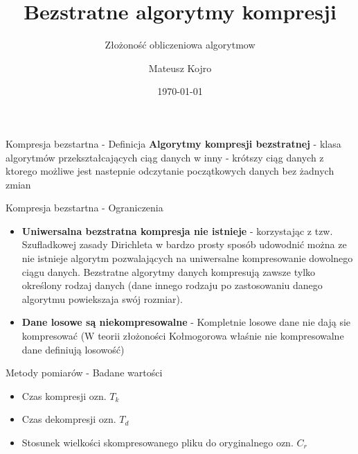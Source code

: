 \documentclass[aspectratio=169]{beamer}
\title{Bezstratne algorytmy kompresji}
\subtitle{Złożoność obliczeniowa algorytmow}
\author{Mateusz Kojro}
\date{\today}
\begin{document}
    \begin{frame}[plain]
        \maketitle
    \end{frame}

    \begin{frame}{Kompresja bezstartna - Definicja}
        \textbf{Algorytmy kompresji bezstratnej} - klasa algorytmów przekształcających ciąg
        danych w inny - krótszy ciąg danych z ktorego możliwe jest nastepnie
        odczytanie początkowych danych bez żadnych zmian
    \end{frame}

    
    \begin{frame}{Kompresja bezstartna - Ograniczenia}
        \begin{itemize}
            \item \textbf{Uniwersalna bezstratna kompresja nie istnieje} - korzystając z tzw. Szufladkowej zasady Dirichleta w bardzo prosty sposób udowodnić można ze nie istnieje algorytm pozwalających na uniwersalne kompresowanie dowolnego ciągu danych. Bezstratne algorytmy danych kompresują zawsze tylko określony rodzaj danych (dane innego rodzaju po zastosowaniu danego algorytmu powiekszaja swój rozmiar).
            \item \textbf{Dane losowe są niekompresowalne} - Kompletnie losowe dane nie dają sie kompresować (W teorii złożoności Kołmogorowa właśnie nie kompresowalne dane definiują losowość)
        \end{itemize}
    \end{frame}

    \begin{frame}{Metody pomiarów - Badane wartości}
        \begin{itemize}
            \item Czas kompresji ozn. $T_k$
            \item Czas dekompresji ozn. $T_d$
            \item Stosunek wielkości skompresowanego pliku do oryginalnego ozn. $C_r$
        \end{itemize}
    \end{frame}
\end{document}
